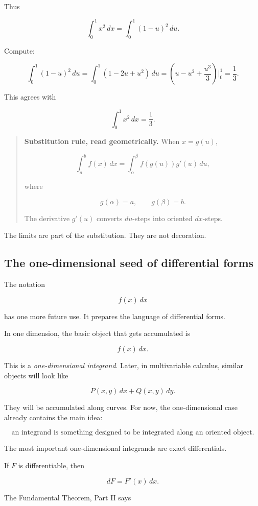 Thus

\[
\int_0^1 x^2\,dx
=
\int_0^1 (1-u)^2\,du.
\]

Compute:

\[
\int_0^1 (1-u)^2\,du
=
\int_0^1 (1-2u+u^2)\,du
=
\left(u-u^2+\frac{u^3}{3}\right)\Big|_0^1
=
\frac13.
\]

This agrees with

\[
\int_0^1 x^2\,dx=\frac13.
\]

\begin{quote}
\textbf{Substitution rule, read geometrically.}
When \(x=g(u)\),

\[
\int_a^b f(x)\,dx
=
\int_{\alpha}^{\beta} f(g(u))g'(u)\,du,
\]

where

\[
g(\alpha)=a,
\qquad
g(\beta)=b.
\]

The derivative \(g'(u)\) converts \(du\)-steps into oriented \(dx\)-steps.
\end{quote}

The limits are part of the substitution.  They are not decoration.

\subsection{The one-dimensional seed of differential forms}
\label{subsec:one-dimensional-seed-forms}

The notation

\[
f(x)\,dx
\]

has one more future use.  It prepares the language of differential forms.

In one dimension, the basic object that gets accumulated is

\[
f(x)\,dx.
\]

This is a \emph{one-dimensional integrand}.  Later, in multivariable calculus, similar
objects will look like

\[
P(x,y)\,dx+Q(x,y)\,dy.
\]

They will be accumulated along curves.  For now, the one-dimensional case already
contains the main idea:

\[
\boxed{
\text{an integrand is something designed to be integrated along an oriented object.}
}
\]

The most important one-dimensional integrands are exact differentials.

If \(F\) is differentiable, then

\[
dF=F'(x)\,dx.
\]

The Fundamental Theorem, Part II says

